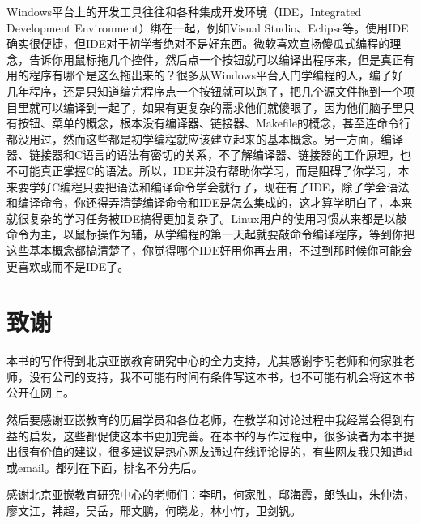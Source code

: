 Windows平台上的开发工具往往和各种集成开发环境（IDE，Integrated Development Environment）绑在一起，例如Visual Studio、Eclipse等。使用IDE确实很便捷，但IDE对于初学者绝对不是好东西。微软喜欢宣扬傻瓜式编程的理念，告诉你用鼠标拖几个控件，然后点一个按钮就可以编译出程序来，但是真正有用的程序有哪个是这么拖出来的？很多从Windows平台入门学编程的人，编了好几年程序，还是只知道编完程序点一个按钮就可以跑了，把几个源文件拖到一个项目里就可以编译到一起了，如果有更复杂的需求他们就傻眼了，因为他们脑子里只有按钮、菜单的概念，根本没有编译器、链接器、Makefile的概念，甚至连命令行都没用过，然而这些都是初学编程就应该建立起来的基本概念。另一方面，编译器、链接器和C语言的语法有密切的关系，不了解编译器、链接器的工作原理，也不可能真正掌握C的语法。所以，IDE并没有帮助你学习，而是阻碍了你学习，本来要学好C编程只要把语法和编译命令学会就行了，现在有了IDE，除了学会语法和编译命令，你还得弄清楚编译命令和IDE是怎么集成的，这才算学明白了，本来就很复杂的学习任务被IDE搞得更加复杂了。Linux用户的使用习惯从来都是以敲命令为主，以鼠标操作为辅，从学编程的第一天起就要敲命令编译程序，等到你把这些基本概念都搞清楚了，你觉得哪个IDE好用你再去用，不过到那时候你可能会更喜欢或而不是IDE了。


\section*{致谢}
%


本书的写作得到北京亚嵌教育研究中心的全力支持，尤其感谢李明老师和何家胜老师，没有公司的支持，我不可能有时间有条件写这本书，也不可能有机会将这本书公开在网上。



然后要感谢亚嵌教育的历届学员和各位老师，在教学和讨论过程中我经常会得到有益的启发，这些都促使这本书更加完善。在本书的写作过程中，很多读者为本书提出很有价值的建议，很多建议是热心网友通过在线评论提的，有些网友我只知道id或email。都列在下面，排名不分先后。



感谢北京亚嵌教育研究中心的老师们：李明，何家胜，邸海霞，郎铁山，朱仲涛，廖文江，韩超，吴岳，邢文鹏，何晓龙，林小竹，卫剑钒。




